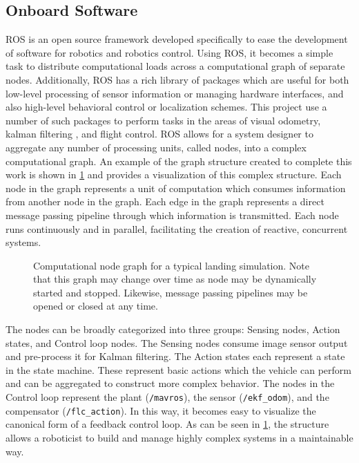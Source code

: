 \subsection{Onboard Software} ROS is an open source framework developed specifically to ease the development
of software for robotics and robotics control\cite{quigley2009ros}. Using ROS, it becomes a simple task to
distribute computational loads across a computational graph of separate nodes. Additionally, ROS has a rich
library of packages which are useful for both low-level processing of sensor information or managing hardware
interfaces, and also high-level behavioral control or localization schemes. This project use a number of such
packages to perform tasks in the areas of visual odometry\cite{olson2011tags}, kalman filtering
\cite{MooreStouchKeneralizedEkf2014}, and flight control\cite{rotors:2016,meier2015px4}. ROS allows for a
system designer to aggregate any number of processing units, called nodes, into a  complex computational graph.
An example of the graph structure created to complete this work is shown in \cref{f:rosgraph} and provides a
visualization of this complex structure. Each node in the graph represents a unit of computation which
consumes information from another node in the graph. Each edge in the graph represents a direct message
passing pipeline through which information is transmitted. Each node runs continuously and in parallel,
facilitating the creation of reactive, concurrent systems.

\begin{figure}[H]
    \centering
    \caption{Computational node graph for a typical landing simulation. Note that this graph may change over
    time as node may be dynamically started and stopped. Likewise, message passing pipelines may be opened or
    closed at any time.}\label{f:rosgraph}
\end{figure}

The nodes can be broadly categorized into three groups: Sensing nodes, Action states, and Control loop nodes.
The Sensing nodes consume image sensor output and pre-process it for Kalman filtering.
The Action states each represent a state in the state machine. These represent basic actions which the vehicle
can perform and can be aggregated to construct more complex behavior. The nodes in the Control loop represent
the plant (\verb|/mavros|), the sensor (\verb|/ekf_odom|), and the compensator (\verb|/flc_action|). In this
way, it becomes easy to visualize the canonical form of a feedback control loop. As can be seen in
\cref{f:rosgraph}, the structure allows a roboticist to build and manage highly complex systems in a
maintainable way.

